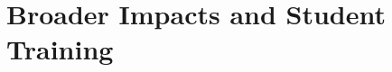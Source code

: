 \documentclass[oneside,11pt]{amsart}
\begin{document}









\section{Broader Impacts and Student Training}
\label{sec:bi}
\end{document}
